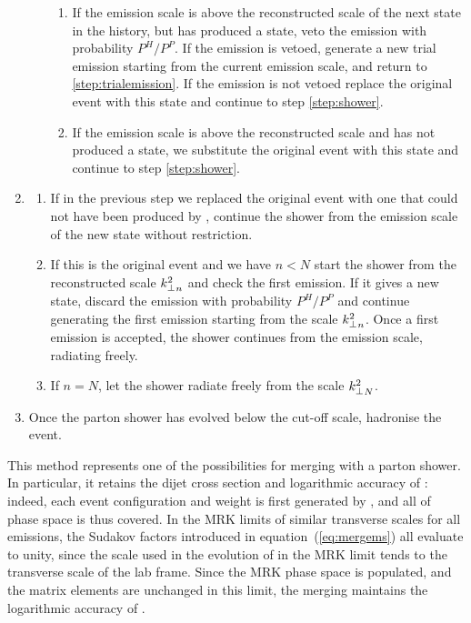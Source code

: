 \begin{enumerate}
\begin{enumerate}
\begin{enumerate}
     \item If the emission scale is above the reconstructed scale of the next state in the history,
     but has produced a \HEJ state, veto the emission with probability $P^H/P^P$.
     If the emission is vetoed, generate a new trial emission starting from the current
       emission scale, and return to \ref{step:trialemission}.
       If the emission is not vetoed replace the original event with this state 
       and continue to step \ref{step:shower}.
    \item If the emission scale is above the reconstructed scale and has not produced a \HEJ state, we
       substitute the original event with this state and continue to step \ref{step:shower}.
    \end{enumerate}  
  
  \end{enumerate}
  \item \label{step:shower}
  \begin{enumerate}
   \item If in the previous step we replaced the original event with one that could not have been produced by \HEJ,
    continue the shower from the emission scale of the new state without restriction.
   \item If this is the original event and we have $n < N$ start the shower from the reconstructed scale ${k^2_\perp}_{n}$ and check the first emission. 
   If it gives a new  \HEJ state, discard the emission with probability $P^H/P^P$ and continue generating the first emission starting from 
   the scale ${k^2_\perp}_{n}$.
   Once a first emission is accepted, the shower continues from the emission scale, radiating freely.
   \item If $n=N$, let the shower radiate freely from the scale ${k^2_\perp}_{N}$.
  \end{enumerate}
  \item Once the parton shower has evolved below the cut-off scale, hadronise the event.
\end{enumerate}

This method represents one of the possibilities for merging \HEJ with a
parton shower. In particular, it retains the dijet cross section and
logarithmic accuracy of \HEJ: indeed, each event configuration and weight is
first generated by \HEJ, and all of phase space is thus covered. In the MRK
limits of similar transverse scales for all emissions, the Sudakov factors
introduced in equation~(\ref{eq:mergems}) all evaluate to unity, since
the scale used in the evolution of \pyt in the MRK limit tends to the
transverse scale of the lab frame. Since the MRK phase space is populated,
and the matrix elements are unchanged in this limit, the merging maintains the
logarithmic accuracy of \HEJ.

